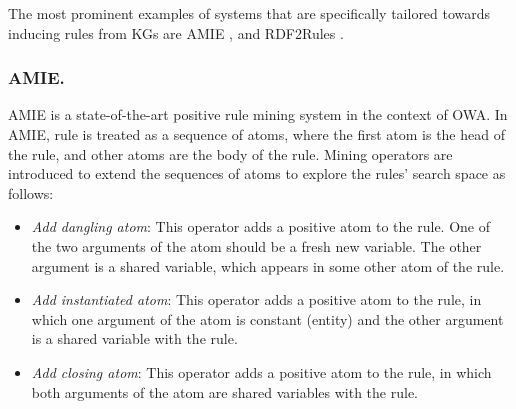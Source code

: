 The most prominent examples of systems that are specifically tailored towards inducing rules from KGs are AMIE \cite{amie}, %
and RDF2Rules \cite{rdf2rules}.
\subsubsection{AMIE.}
AMIE \cite{amie} is a state-of-the-art positive rule mining system in the context of OWA. 
In AMIE, rule is treated as a sequence of atoms, where the first atom is the head of the rule, and other atoms are the body of the rule. Mining operators are introduced to extend the sequences of atoms to explore the rules' search space as follows:
\begin{itemize}
\item \textit{Add dangling atom}: This operator adds a positive atom to the rule. One of the two arguments of the atom should be a fresh new variable. The other argument is a shared variable, which appears in some other atom of the rule.
\item \textit{Add instantiated atom}: This operator adds a positive atom to the rule, in which one argument of the atom is constant (entity) and the other argument is a shared variable with the rule.
\item \textit{Add closing atom}: This operator adds a positive atom to the rule, in which both arguments of the atom are shared variables with the rule.
\end{itemize}
